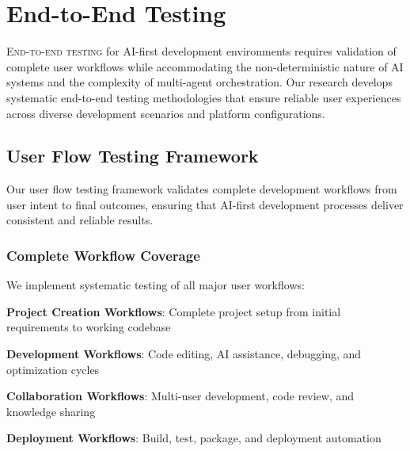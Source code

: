 
\section*{End-to-End Testing}

\vspace{0.5cm}
\lettrine{E}{nd-to-end testing} for AI-first development environments requires validation of complete user workflows while accommodating the non-deterministic nature of AI systems and the complexity of multi-agent orchestration. Our research develops systematic end-to-end testing methodologies that ensure reliable user experiences across diverse development scenarios and platform configurations.

\subsection*{User Flow Testing Framework}

Our user flow testing framework validates complete development workflows from user intent to final outcomes, ensuring that AI-first development processes deliver consistent and reliable results.

\subsubsection*{Complete Workflow Coverage}

We implement systematic testing of all major user workflows:

\begin{expandedlist}
    \item \textbf{Project Creation Workflows}: Complete project setup from initial requirements to working codebase
    \item \textbf{Development Workflows}: Code editing, AI assistance, debugging, and optimization cycles
    \item \textbf{Collaboration Workflows}: Multi-user development, code review, and knowledge sharing
    \item \textbf{Deployment Workflows}: Build, test, package, and deployment automation
\end{expandedlist}

